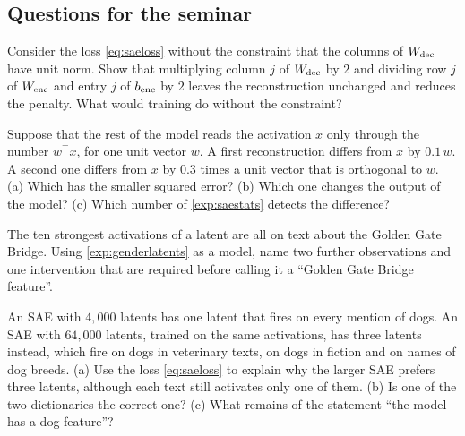\subsection*{Questions for the seminar}

\begin{exercise}\label{ex:normconstraint}
Consider the loss \eqref{eq:saeloss} without the constraint that the columns of $W_{\mathrm{dec}}$ have unit norm. Show
that multiplying column $j$ of $W_{\mathrm{dec}}$ by $2$ and dividing row $j$ of $W_{\mathrm{enc}}$ and entry $j$ of $b_{\mathrm{enc}}$ by $2$
leaves the reconstruction unchanged and reduces the penalty. What would training do without the constraint?
\end{exercise}

\begin{exercise}\label{ex:wrongplace}
Suppose that the rest of the model reads the activation $x$ only through the number $w^\top x$, for one unit
vector $w$. A first reconstruction differs from $x$ by $0.1\,w$. A second one differs from $x$ by $0.3$ times a
unit vector that is orthogonal to $w$. (a) Which has the smaller squared error? (b) Which one changes the output
of the model? (c) Which number of \cref{exp:saestats} detects the difference?
\end{exercise}

\begin{exercise}\label{ex:ggb}
The ten strongest activations of a latent are all on text about the Golden Gate Bridge. Using
\cref{exp:genderlatents} as a model, name two further observations and one intervention that are required before
calling it a ``Golden Gate Bridge feature''.
\end{exercise}

\begin{exercise}\label{ex:splitting}
An SAE with $4{,}000$ latents has one latent that fires on every mention of dogs. An SAE with $64{,}000$ latents,
trained on the same activations, has three latents instead, which fire on dogs in veterinary texts, on dogs in
fiction and on names of dog breeds. (a) Use the loss \eqref{eq:saeloss} to explain why the larger SAE prefers
three latents, although each text still activates only one of them. (b) Is one of the two dictionaries the
correct one? (c) What remains of the statement ``the model has a dog feature''?
\end{exercise}

